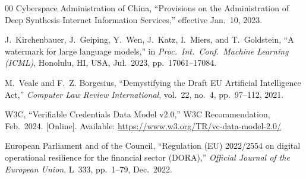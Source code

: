 \documentclass[conference]{IEEEtran}
\begin{document}
\begin{thebibliography}{00}
Cyberspace Administration of China, ``Provisions on the Administration
of Deep Synthesis Internet Information Services,'' effective
Jan.\ 10, 2023.

J.~Kirchenbauer, J.~Geiping, Y.~Wen, J.~Katz, I.~Miers, and
T.~Goldstein, ``A watermark for large language models,'' in \emph{Proc.\
Int.\ Conf.\ Machine Learning (ICML)}, Honolulu, HI, USA,
Jul.\ 2023, pp.\ 17061--17084.

M.~Veale and F.~Z. Borgesius, ``Demystifying the Draft EU Artificial
Intelligence Act,'' \emph{Computer Law Review International}, vol.\ 22,
no.\ 4, pp.\ 97--112, 2021.

W3C, ``Verifiable Credentials Data Model v2.0,'' W3C Recommendation,
Feb.\ 2024. [Online]. Available:
\url{https://www.w3.org/TR/vc-data-model-2.0/}

European Parliament and of the Council, ``Regulation (EU) 2022/2554 on
digital operational resilience for the financial sector (DORA),''
\emph{Official Journal of the European Union}, L~333, pp.\ 1--79,
Dec.\ 2022.

\end{thebibliography}
\end{document}
